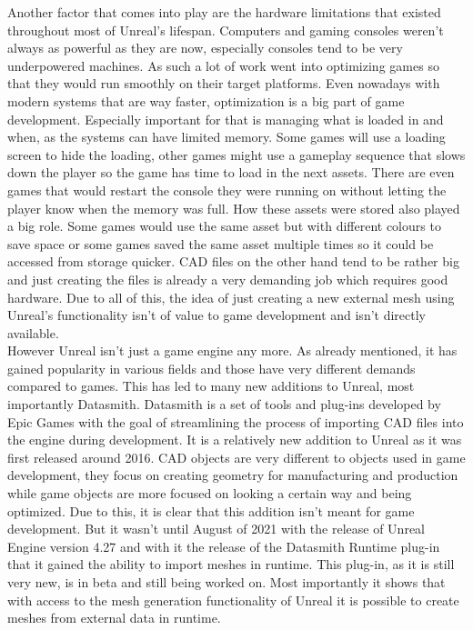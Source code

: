 Another factor that comes into play are the hardware limitations that existed throughout most of Unreal's lifespan. Computers and gaming consoles weren't always as powerful as they are now, especially consoles tend to be very underpowered machines. As such a lot of work went into optimizing games so that they would run smoothly on their target platforms. Even nowadays with modern systems that are way faster, optimization is a big part of game development. Especially important for that is managing what is loaded in and when, as the systems can have limited memory. Some games will use a loading screen to hide the loading, other games might use a gameplay sequence that slows down the player so the game has time to load in the next assets. There are even games that would restart the console they were running on without letting the player know when the memory was full\cite{bib:Morrowind}. How these assets were stored also played a big role. Some games would use the same asset but with different colours to save space or some games saved the same asset multiple times so it could be accessed from storage quicker. \acs{CAD} files on the other hand tend to be rather big and just creating the files is already a very demanding job which requires good hardware. Due to all of this, the idea of just creating a new external mesh using Unreal's functionality isn't of value to game development and isn't directly available.\\
However Unreal isn't just a game engine any more. As already mentioned, it has gained popularity in various fields and those have very different demands compared to games. This has led to many new additions to Unreal, most importantly Datasmith. Datasmith is a set of tools and plug-ins developed by Epic Games with the goal of streamlining the process of importing \acs{CAD} files into the engine during development\cite{bib:DSDoc}. It is a relatively new addition to Unreal as it was first released around 2016. \acs{CAD} objects are very different to objects used in game development, they focus on creating geometry for manufacturing and production while game objects are more focused on looking a certain way and being optimized. Due to this, it is clear that this addition isn't meant for game development. But it wasn't until August of 2021 with the release of Unreal Engine version 4.27 and with it the release of the Datasmith Runtime plug-in that it gained the ability to import meshes in runtime\cite{bib:DSRunDoc}. This plug-in, as it is still very new, is in beta and still being worked on. Most importantly it shows that with access to the mesh generation functionality of Unreal it is possible to create meshes from external data in runtime.\\ 

